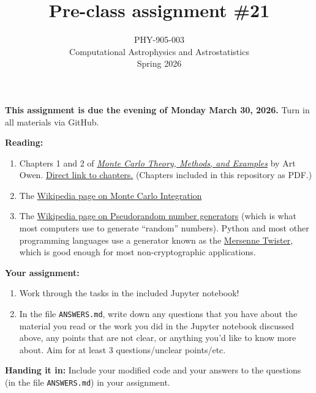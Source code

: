 \documentclass[10pt]{article}
\title{Pre-class assignment \#21}
\author{PHY-905-003\\Computational Astrophysics and
  Astrostatistics\\Spring 2026}
\date{} %
\begin{document}
 
\maketitle

\vspace{-10mm}

\noindent
\textbf{This assignment is due the evening of Monday March 30, 2026.}
 Turn in all materials via GitHub.

\vspace{5mm}

\noindent
\textbf{Reading:}

\begin{enumerate}

\item Chapters 1 and 2 of
  \href{https://artowen.su.domains/mc/}{\textit{Monte Carlo
      Theory, Methods, and Examples}} by Art Owen.  \href{https://artowen.su.domains/mc/Ch-intro.pdf}{Direct
    link to chapters.}  (Chapters included in this repository as PDF.)

\item The
  \href{https://en.wikipedia.org/wiki/Monte\_Carlo\_integration}{Wikipedia
    page on Monte Carlo Integration}

\item The
  \href{https://en.wikipedia.org/wiki/Pseudorandom_number_generator}{Wikipedia
  page on Pseudorandom number generators} (which is what most
computers use to generate ``random'' numbers).  Python and most other
programming languages use a generator known as the \href{https://en.wikipedia.org/wiki/Mersenne_Twister}{Mersenne
  Twister}, which is good enough for most non-cryptographic applications.

\end{enumerate}

\noindent
\textbf{Your assignment:}

\begin{enumerate}

\item Work through the tasks in the included Jupyter notebook!

\item In the file \texttt{ANSWERS.md}, write down any questions that
you have about the material you read or the work you did in the
Jupyter notebook discussed above, any points that are not clear, or
anything you'd like to know more about.  Aim for at least 3
questions/unclear points/etc.

\end{enumerate}

\noindent \textbf{Handing it in:} Include your modified code and
your answers to the questions (in the file \texttt{ANSWERS.md})
in your assignment.
\end{document}
